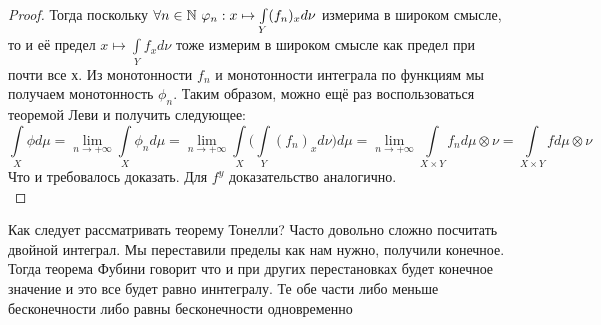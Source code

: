 \begin{proof}
Тогда поскольку $\forall n \in \mathbb{N} \   \varphi_n: x \mapsto \int\limits_Y (f_n)_xd\nu$ измерима в широком смысле, то и её предел $x \mapsto \int\limits_Y f_xd\nu$ тоже измерим в широком смысле как предел при почти все $х$. Из монотонности $f_n$ и монотонности интеграла по функциям мы получаем монотонность $\phi_n$. Таким образом, можно ещё раз воспользоваться теоремой Леви и получить следующее: \[\int\limits_X \phi d\mu = \lim\limits_{n \rightarrow +\infty} \int\limits_X \phi_n d\mu = \lim\limits_{n \rightarrow +\infty} \int\limits_X \biggl(\int\limits_Y (f_n)_xd\nu\biggr)d\mu = \lim\limits_{n \rightarrow +\infty} \int\limits_{X \times Y} f_n d\mu\otimes\nu = \int\limits_{X \times Y} fd\mu\otimes\nu \]
Что и требовалось доказать. Для $f^y$ доказательство аналогично.\\
\end{proof}
\begin{note}
    Как следует рассматривать теорему Тонелли? Часто довольно сложно посчитать двойной интеграл. Мы переставили пределы как нам нужно, получили конечное. Тогда теорема Фубини говорит что и при других перестановках будет конечное значение и это все будет равно иннтегралу. Те обе части либо меньше бесконечности либо равны бесконечности одновременно
\end{note}

